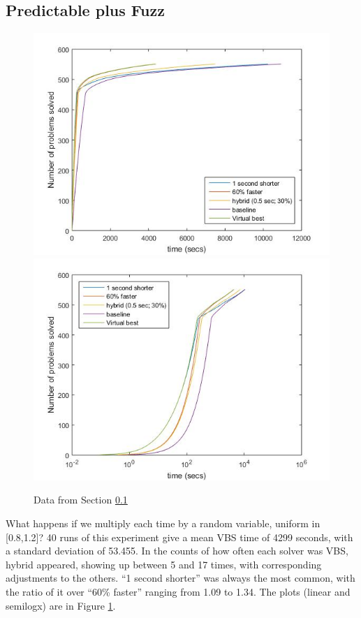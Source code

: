 \documentclass{easychair}
\begin{document}
\subsection{Predictable plus Fuzz}\label{sec:P+f}
\begin{figure}[h]
\caption{Data from Section \ref{sec:P+f}\label{Fig:S3}}
\includegraphics[scale=0.60]{Fig3a.jpg}
\includegraphics[scale=0.60]{Fig3b.jpg}
\end{figure}
What happens if we multiply each time by a random variable, uniform in [0.8,1.2]? 
40 runs of this experiment give a mean VBS time of 4299 seconds, with a standard deviation of 53.455. In the counts of how often each solver was VBS, hybrid appeared, showing up between 5 and 17 times, with corresponding adjustments to the others. ``1 second shorter'' was always the most common, with the ratio of it over ``60\% faster'' ranging from 1.09 to 1.34. The plots (linear and semilogx) are in Figure \ref{Fig:S3}.
\end{document}
